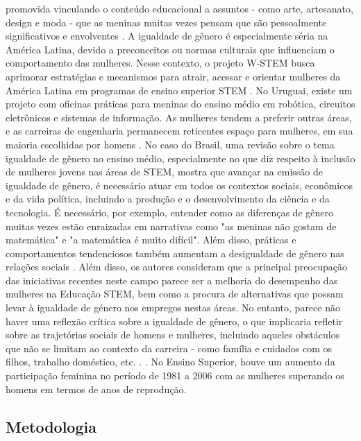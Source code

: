 promovida vinculando o conteúdo educacional a assuntos - como arte, artesanato, design e moda - que as meninas muitas vezes pensam que são pessoalmente significativos e envolventes \citep{ogle_fashion_2019}. A igualdade de gênero é especialmente séria na América Latina, devido a preconceitos ou normas culturais que influenciam o comportamento das mulheres. Nesse contexto, o projeto W-STEM busca aprimorar estratégias e mecanismos para atrair, acessar e orientar mulheres da América Latina em programas de ensino superior STEM \citep{garcia-holgado_engaging_2019}. No Uruguai, existe um projeto com oficinas práticas para meninas do ensino médio em robótica, circuitos eletrônicos e sistemas de informação. As mulheres tendem a preferir outras áreas, e as carreiras de engenharia permanecem reticentes espaço para mulheres, em sua maioria escolhidas por homens \citep{delgado_encouraging_2019}. No caso do Brasil, uma revisão sobre o tema igualdade de gênero no ensino médio, especialmente no que diz respeito à inclusão de mulheres jovens nas áreas de STEM, mostra que avançar na emissão de igualdade de gênero, é necessário atuar em todos os contextos sociais, econômicos e da vida política, incluindo a produção e o desenvolvimento da ciência e da tecnologia. É necessário, por exemplo, entender como as diferenças de gênero muitas vezes estão enraizadas em narrativas como "as meninas não gostam de matemática" e "a matemática é muito difícil". Além disso, práticas e comportamentos tendenciosos também aumentam a desigualdade de gênero nas relações sociais \citep{oliveira_stem_2019}. Além disso, os autores consideram que a principal preocupação das iniciativas recentes neste campo parece ser a melhoria do desempenho das mulheres na Educação STEM, bem como a procura de alternativas que possam levar à igualdade de género nos empregos nestas áreas. No entanto, parece não haver uma reflexão crítica sobre a igualdade de gênero, o que implicaria refletir sobre as trajetórias sociais de homens e mulheres, incluindo aqueles obstáculos que não se limitam ao contexto da carreira - como família e cuidados com os filhos, trabalho doméstico, etc. . \citep{oliveira_stem_2019}. No Ensino Superior, houve um aumento da participação feminina no período de 1981 a 2006 com as mulheres superando os homens em termos de anos de reprodução.

\subsection{Metodologia}

